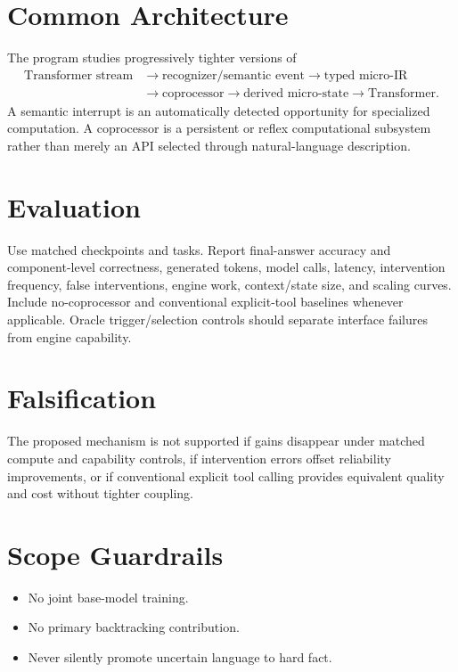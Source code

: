 \documentclass[11pt]{article}
\begin{document}
\section{Common Architecture}
The program studies progressively tighter versions of
\[
\begin{aligned}
\text{Transformer stream}
&\rightarrow \text{recognizer/semantic event}
\rightarrow \text{typed micro-IR} \\
&\rightarrow \text{coprocessor}
\rightarrow \text{derived micro-state}
\rightarrow \text{Transformer}.
\end{aligned}
\]
A semantic interrupt is an automatically detected opportunity for specialized computation. A coprocessor is a persistent or reflex computational subsystem rather than merely an API selected through natural-language description.

\section{Evaluation}
Use matched checkpoints and tasks. Report final-answer accuracy and component-level correctness, generated tokens, model calls, latency, intervention frequency, false interventions, engine work, context/state size, and scaling curves. Include no-coprocessor and conventional explicit-tool baselines whenever applicable. Oracle trigger/selection controls should separate interface failures from engine capability.

\section{Falsification}
The proposed mechanism is not supported if gains disappear under matched compute and capability controls, if intervention errors offset reliability improvements, or if conventional explicit tool calling provides equivalent quality and cost without tighter coupling.

\section{Scope Guardrails}
\begin{itemize}
\item No joint base-model training.
\item No primary backtracking contribution.
\item Never silently promote uncertain language to hard fact.
\end{itemize}
\end{document}
